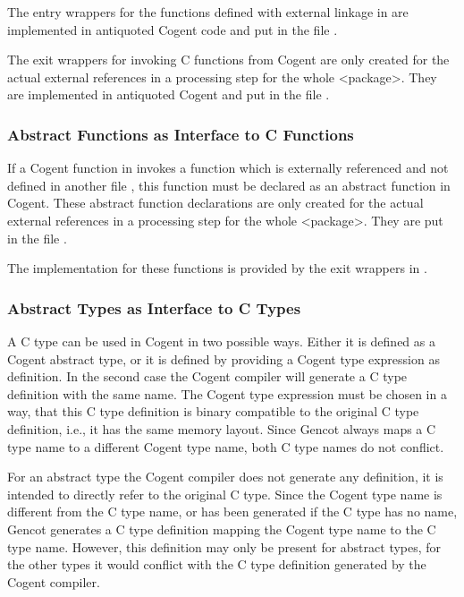 The entry wrappers for the functions defined with external linkage in  are implemented in antiquoted Cogent code and
put in the file . 

The exit wrappers for invoking C functions from Cogent are only created for the actual
external references in a processing step for the whole <package>. They are implemented in antiquoted Cogent
and put in the file .

\subsubsection{Abstract Functions as Interface to C Functions}

If a Cogent function in  invokes a function which is externally referenced and not defined in another
file , this function must be declared as an abstract function in Cogent. These abstract function declarations
are only created for the actual
external references in a processing step for the whole <package>. They are put in the file .

The implementation for these functions is provided by the exit wrappers in .

\subsubsection{Abstract Types as Interface to C Types}

A C type can be used in Cogent in two possible ways. Either it is defined as a Cogent abstract type, or it is defined by providing
a Cogent type expression as definition. In the second case the Cogent compiler will generate a C type definition with the
same name. The Cogent type expression must be chosen in a way, that this C type definition is binary compatible to the
original C type definition, i.e., it has the same memory layout. Since Gencot always maps a C type name to a different Cogent
type name, both C type names do not conflict.

For an abstract type the Cogent compiler does not generate any definition, it is intended to directly refer to the original
C type. Since the Cogent type name is different from the C type name, or has been generated if the C type has no name,
Gencot generates a C type definition mapping the Cogent type name to the C type name.
However, this definition may only be present for abstract types, for the other types it would conflict with the C type
definition generated by the Cogent compiler. 

